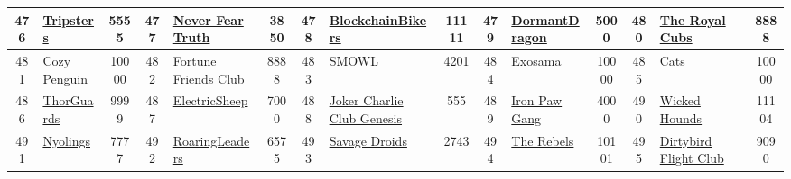 \begin{table*}[]
{\begin{tabular}{|c|l|c|c|l|c|c|l|c|c|l|c|c|l|c|}
        476   & \href{http://tripsters.io}{Tripsters}                                              & 5555              & 477   & \href{http://www.neverfeartruth.com}{Never Fear Truth}                                            & 3850              & 478   & \href{https://opensea.io/collection/blockchainbikers}{BlockchainBikers}           & 11111             & 479   & \href{https://dormantdragons.com/}{DormantDragon}                             & 5000              & 480   & \href{https://www.theroyalcubs.com}{The Royal Cubs}                                       & 8888                                    \\ \hline
        481   & \href{https://cozyverse.xyz}{Cozy Penguin}                                         & 10000             & 482   & \href{http://fortunefriends.club}{Fortune Friends Club}                                           & 8888              & 483   & \href{http://smowl.xyz}{SMOWL}                                                    & 4201              & 484   & \href{https://exosama.com}{Exosama}                                           & 10000             & 485   & \href{https://opensea.io/collection/cmykatz-nfts}{Cats}                                   & 10000                                   \\ \hline
        486   & \href{http://thorguards.com}{ThorGuards}                                           & 9999              & 487   & \href{https://es.ultiverse.io/}{ElectricSheep}                                                    & 7000              & 488   & \href{https://jokercharlieclub.com/}{Joker Charlie Club Genesis}                  & 555               & 489   & \href{http://ironpaw.io}{Iron Paw Gang}                                       & 4000              & 490   & \href{https://wickedapes.com/}{Wicked Hounds}                                             & 11104                                   \\ \hline
        491   & \href{http://nyolings.io}{Nyolings}                                                & 7777              & 492   & \href{https://roaringleaders.io/}{RoaringLeaders}                                                 & 6575              & 493   & \href{https://www.savagedroids.com/}{Savage Droids}                               & 2743              & 494   & \href{https://therebels.io}{The Rebels}                                       & 10101             & 495   & \href{https://dirtybirdrecords.com/pages/flightclub}{Dirtybird Flight Club}               & 9090                                    \\ \hline

\end{tabular}}
\end{table*}

